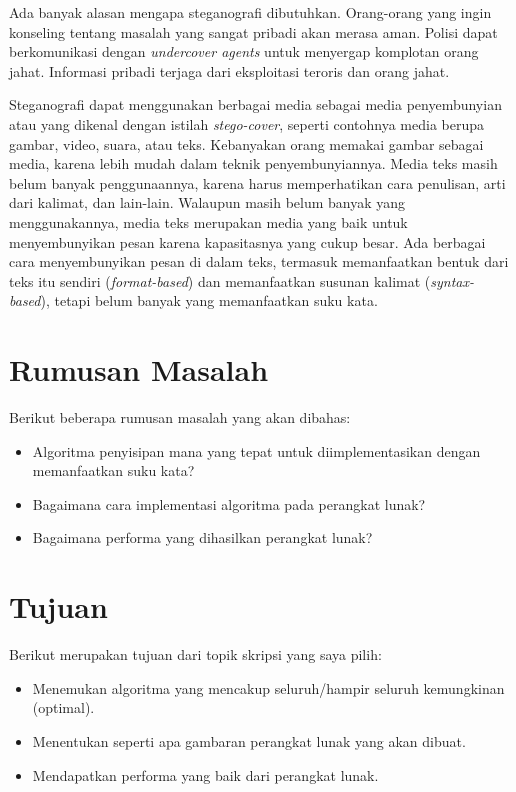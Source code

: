 Ada banyak alasan mengapa steganografi dibutuhkan. \cite{Dpcrypto:2009}Orang-orang yang ingin konseling tentang masalah yang sangat pribadi akan merasa aman. Polisi dapat berkomunikasi dengan \textit{undercover agents} untuk menyergap komplotan orang jahat. Informasi pribadi terjaga dari eksploitasi teroris dan orang jahat.

Steganografi dapat menggunakan berbagai media sebagai media penyembunyian atau yang dikenal dengan istilah \textit{stego-cover}, seperti contohnya media berupa gambar, video, suara, atau teks. Kebanyakan orang memakai gambar sebagai media, karena lebih mudah dalam teknik penyembunyiannya. Media teks masih belum banyak penggunaannya, karena harus memperhatikan cara penulisan, arti dari kalimat, dan lain-lain. Walaupun masih belum banyak yang menggunakannya, media teks merupakan media yang baik untuk menyembunyikan pesan karena kapasitasnya yang cukup besar. Ada berbagai cara menyembunyikan pesan di dalam teks, termasuk memanfaatkan bentuk dari teks itu sendiri (\textit{format-based}) dan memanfaatkan susunan kalimat (\textit{syntax-based}), tetapi belum banyak yang memanfaatkan suku kata.

\section{Rumusan Masalah}
\label{rumusanMasalah}
Berikut beberapa rumusan masalah yang akan dibahas:
\begin{itemize}
	\item Algoritma penyisipan mana yang tepat untuk diimplementasikan dengan memanfaatkan suku kata?
	\item Bagaimana cara implementasi algoritma pada perangkat lunak?
	\item Bagaimana performa yang dihasilkan perangkat lunak?
\end{itemize}

\section{Tujuan}
\label{sec:tujuan}
Berikut merupakan tujuan dari topik skripsi yang saya pilih:
\begin{itemize}
	\item Menemukan algoritma yang mencakup seluruh/hampir seluruh kemungkinan (optimal).
	\item Menentukan seperti apa gambaran perangkat lunak yang akan dibuat.
	\item Mendapatkan performa yang baik dari perangkat lunak.
\end{itemize}


